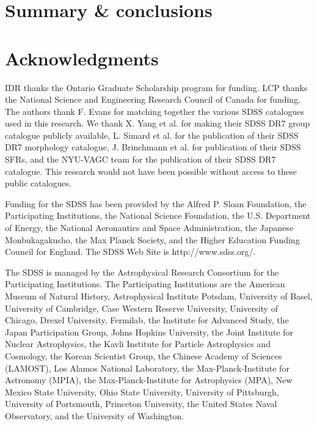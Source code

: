 \documentclass[a4paper,fleqn,usenatbib]{mnras}
\begin{document}

\section{Summary \& conclusions}
\label{sec:summary} 


\section*{Acknowledgments}
\label{sec:acknowledgments}

IDR thanks the Ontario Graduate Scholarship program for funding.  LCP
thanks the National Science and Engineering Research
Council of Canada for funding.  The authors thank
F. Evans for matching together the various SDSS catalogues used in
this research.  We thank X. Yang et al. for
making their
SDSS DR7 group catalogue publicly available, L. Simard et al. for the
publication of their SDSS DR7 morphology catalogue, J. Brinchmann et al. for
publication of their SDSS SFRs, and the NYU-VAGC
team for the 
publication of their SDSS DR7 catalogue.  This research would not have
been possible without access to these public catalogues.
\par
Funding for the SDSS has been provided by the Alfred P. Sloan
Foundation, the Participating Institutions, the National Science
Foundation, the U.S. Department of Energy, the National Aeronautics
and Space Administration, the Japanese Monbukagakusho, the Max Planck
Society, and the Higher Education Funding Council for England. The
SDSS Web Site is http://www.sdss.org/.
\par
The SDSS is managed by the Astrophysical Research Consortium for the
Participating Institutions. The Participating Institutions are the
American Museum of Natural History, Astrophysical Institute Potsdam,
University of Basel, University of Cambridge, Case Western Reserve
University, University of Chicago, Drexel University, Fermilab, the
Institute for Advanced Study, the Japan Participation Group, Johns
Hopkins University, the Joint Institute for Nuclear Astrophysics, the
Kavli Institute for Particle Astrophysics and Cosmology, the Korean
Scientist Group, the Chinese Academy of Sciences (LAMOST), Los Alamos
National Laboratory, the Max-Planck-Institute for Astronomy (MPIA),
the Max-Planck-Institute for Astrophysics (MPA), New Mexico State
University, Ohio State University, University of Pittsburgh,
University of Portsmouth, Princeton University, the United States
Naval Observatory, and the University of Washington.
\end{document}
